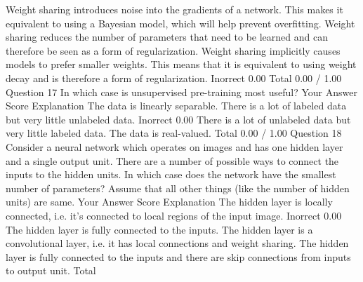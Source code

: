 Weight sharing introduces noise into the gradients of a network. This makes it equivalent to using a Bayesian model, which will help prevent overfitting.			
Weight sharing reduces the number of parameters that need to be learned and can therefore be seen as a form of regularization.			
Weight sharing implicitly causes models to prefer smaller weights. This means that it is equivalent to using weight decay and is therefore a form of regularization.	Inorrect	0.00	
Total		0.00 / 1.00	
Question 17
In which case is unsupervised pre-training most useful?
Your Answer		Score	Explanation
The data is linearly separable.			
There is a lot of labeled data but very little unlabeled data.	Inorrect	0.00	
There is a lot of unlabeled data but very little labeled data.			
The data is real-valued.			
Total		0.00 / 1.00	
Question 18
Consider a neural network which operates on images and has one hidden layer and a single output unit. There are a number of possible ways to connect the inputs to the hidden units. In which case does the network have the smallest number of parameters? Assume that all other things (like the number of hidden units) are same.
Your Answer		Score	Explanation
The hidden layer is locally connected, i.e. it's connected to local regions of the input image.	Inorrect	0.00	
The hidden layer is fully connected to the inputs.			
The hidden layer is a convolutional layer, i.e. it has local connections and weight sharing.			
The hidden layer is fully connected to the inputs and there are skip connections from inputs to output unit.			
Total
